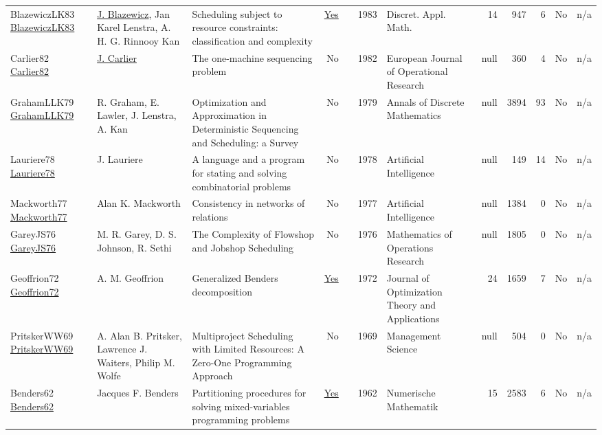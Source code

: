 {\begin{longtable}{>{\raggedright\arraybackslash}p{3cm}>{\raggedright\arraybackslash}p{6cm}>{\raggedright\arraybackslash}p{6.5cm}rrrp{2.5cm}rrrrr}
BlazewiczLK83 \href{https://doi.org/10.1016/0166-218X(83)90012-4}{BlazewiczLK83} & \hyperref[auth:a771]{J. Blazewicz}, Jan Karel Lenstra, A. H. G. Rinnooy Kan & Scheduling subject to resource constraints: classification and complexity & \href{../works/BlazewiczLK83.pdf}{Yes} & \cite{BlazewiczLK83} & 1983 & Discret. Appl. Math. & 14 & 947 & 6 & No & n/a\\
Carlier82 \href{http://dx.doi.org/10.1016/s0377-2217(82)80007-6}{Carlier82} & \hyperref[auth:a852]{J. Carlier} & The one-machine sequencing problem & No & \cite{Carlier82} & 1982 & European Journal of Operational Research & null & 360 & 4 & No & n/a\\
GrahamLLK79 \href{http://dx.doi.org/10.1016/s0167-5060(08)70356-x}{GrahamLLK79} & R. Graham, E. Lawler, J. Lenstra, A. Kan & Optimization and Approximation in Deterministic Sequencing and Scheduling: a Survey & No & \cite{GrahamLLK79} & 1979 & Annals of Discrete Mathematics & null & 3894 & 93 & No & n/a\\
Lauriere78 \href{http://dx.doi.org/10.1016/0004-3702(78)90029-2}{Lauriere78} & J. Lauriere & A language and a program for stating and solving combinatorial problems & No & \cite{Lauriere78} & 1978 & Artificial Intelligence & null & 149 & 14 & No & n/a\\
Mackworth77 \href{http://dx.doi.org/10.1016/0004-3702(77)90007-8}{Mackworth77} & Alan K. Mackworth & Consistency in networks of relations & No & \cite{Mackworth77} & 1977 & Artificial Intelligence & null & 1384 & 0 & No & n/a\\
GareyJS76 \href{http://dx.doi.org/10.1287/moor.1.2.117}{GareyJS76} & M. R. Garey, D. S. Johnson, R. Sethi & The Complexity of Flowshop and Jobshop Scheduling & No & \cite{GareyJS76} & 1976 & Mathematics of Operations Research & null & 1805 & 0 & No & n/a\\
Geoffrion72 \href{http://dx.doi.org/10.1007/bf00934810}{Geoffrion72} & A. M. Geoffrion & Generalized Benders decomposition & \href{../works/Geoffrion72.pdf}{Yes} & \cite{Geoffrion72} & 1972 & Journal of Optimization Theory and Applications & 24 & 1659 & 7 & No & n/a\\
PritskerWW69 \href{http://dx.doi.org/10.1287/mnsc.16.1.93}{PritskerWW69} & A. Alan B. Pritsker, Lawrence J. Waiters, Philip M. Wolfe & Multiproject Scheduling with Limited Resources: A Zero-One Programming Approach & No & \cite{PritskerWW69} & 1969 & Management Science & null & 504 & 0 & No & n/a\\
Benders62 \href{http://dx.doi.org/10.1007/bf01386316}{Benders62} & Jacques F. Benders & Partitioning procedures for solving mixed-variables programming problems & \href{../works/Benders62.pdf}{Yes} & \cite{Benders62} & 1962 & Numerische Mathematik & 15 & 2583 & 6 & No & n/a\\
\end{longtable}
}

